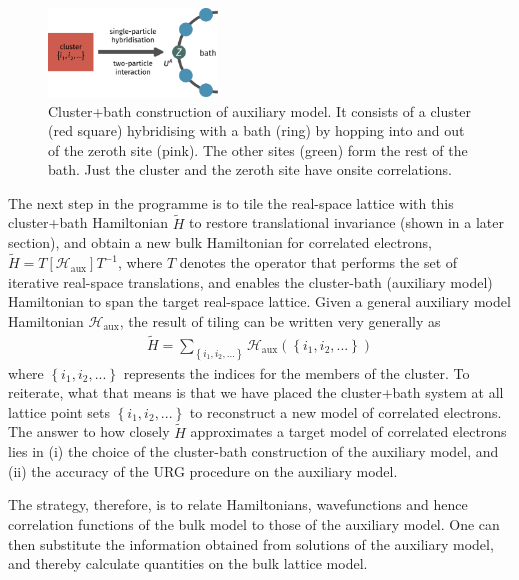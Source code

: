 \documentclass[reprint,hidelinks]{revtex4-2}
\begin{document}
\begin{figure}[!htb]
 	\centering
 	\includegraphics[width=0.4\textwidth]{gen_siam.pdf}
 	\caption{Cluster+bath construction of auxiliary model. It consists of a cluster (red square) hybridising with a bath (ring) by hopping into and out of the zeroth site (pink). The other sites (green) form the rest of the bath. Just the cluster and the zeroth site have onsite correlations.}
 \end{figure}
 The next step in the programme is to tile the real-space lattice with this cluster+bath Hamiltonian \(\tilde H\) to restore translational invariance (shown in a later section), and obtain a new bulk Hamiltonian for correlated electrons, $\tilde H = T\left[ \mathcal{H}_\text{aux} \right] T^{-1}$, where $T$ denotes the operator that performs the set of iterative real-space translations, and enables the cluster-bath (auxiliary model) Hamiltonian to span the target real-space lattice. Given a general auxiliary model Hamiltonian \(\mathcal{H}_\text{aux}\), the result of tiling can be written very generally as
 \begin{equation}\begin{aligned}
	 \tilde H = \sum_{\left\{i_1,i_2,...\right\}} \mathcal{H}_\text{aux}\left(\left\{i_1,i_2,...\right\}\right)
 \end{aligned}\end{equation}
where \(\left\{i_1,i_2,...\right\}\) represents the indices for the members of the cluster. To reiterate, what that means is that we have placed the cluster+bath system at all lattice point sets \(\left\{i_1,i_2,...\right\}\) to reconstruct a new model of correlated electrons. The answer to how closely $\tilde H$ approximates a target model of correlated electrons lies in (i) the choice of the cluster-bath construction of the auxiliary model, and (ii) the accuracy of the URG procedure on the auxiliary model.

The strategy, therefore, is to relate Hamiltonians, wavefunctions and hence correlation functions of the bulk model to those of the auxiliary model. One can then substitute the information obtained from solutions of the auxiliary model, and thereby calculate quantities on the bulk lattice model.
\end{document}

